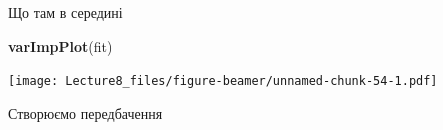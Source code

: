 \documentclass[ignorenonframetext,]{beamer}
\newenvironment{Shaded}{\begin{snugshade}}{\end{snugshade}}
\newcommand{\DataTypeTok}[1]{\textcolor[rgb]{0.13,0.29,0.53}{#1}}
\newcommand{\KeywordTok}[1]{\textcolor[rgb]{0.13,0.29,0.53}{\textbf{#1}}}
\newcommand{\NormalTok}[1]{#1}
\newcommand{\OperatorTok}[1]{\textcolor[rgb]{0.81,0.36,0.00}{\textbf{#1}}}
\newcommand{\OtherTok}[1]{\textcolor[rgb]{0.56,0.35,0.01}{#1}}
\newcommand{\StringTok}[1]{\textcolor[rgb]{0.31,0.60,0.02}{#1}}
\begin{document}
\begin{frame}[fragile]{Що там в середині}
\protect\hypertarget{ux449ux43e-ux442ux430ux43c-ux432-ux441ux435ux440ux435ux434ux438ux43dux456}{}

\begin{Shaded}
\begin{Highlighting}[]
\KeywordTok{varImpPlot}\NormalTok{(fit)}
\end{Highlighting}
\end{Shaded}

\texttt{[image: Lecture8\_files/figure-beamer/unnamed-chunk-54-1.pdf]}

\end{frame}

\begin{frame}[fragile]{Створюємо передбачення}
\protect\hypertarget{ux441ux442ux432ux43eux440ux44eux454ux43cux43e-ux43fux435ux440ux435ux434ux431ux430ux447ux435ux43dux43dux44f}{}

\begin{Shaded}
\end{Shaded}

\end{frame}
\end{document}
